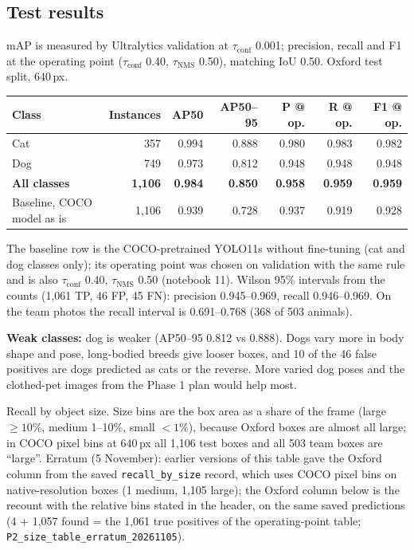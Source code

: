 \documentclass[11pt,a4paper]{article}
\newcommand{\tconf}{$\tau_{\text{conf}}$}
\newcommand{\tnms}{$\tau_{\text{NMS}}$}
\newcommand{\ev}[1]{\nolinkurl{#1}}
\begin{document}
\subsection{Test results}

mAP is measured by Ultralytics validation at \tconf{} 0.001; precision, recall and F1 at the operating point (\tconf{} 0.40, \tnms{} 0.50), matching IoU 0.50. Oxford test split, 640\,px.

{\small
\begin{tabularx}{\linewidth}{@{}Y r r r r r r@{}}
\toprule
Class & Instances & AP50 & AP50--95 & P @ op. & R @ op. & F1 @ op. \\
\midrule
Cat & 357 & 0.994 & 0.888 & 0.980 & 0.983 & 0.982 \\
Dog & 749 & 0.973 & 0.812 & 0.948 & 0.948 & 0.948 \\
\midrule
\textbf{All classes} & \textbf{1,106} & \textbf{0.984} & \textbf{0.850} & \textbf{0.958} & \textbf{0.959} & \textbf{0.959} \\
\midrule
Baseline, COCO model as is & 1,106 & 0.939 & 0.728 & 0.937 & 0.919 & 0.928 \\
\bottomrule
\end{tabularx}}

\smallskip
The baseline row is the COCO-pretrained YOLO11s without fine-tuning (cat and dog classes only); its operating point was chosen on validation with the same rule and is also \tconf{} 0.40, \tnms{} 0.50 (notebook 11). Wilson 95\% intervals from the counts (1,061 TP, 46 FP, 45 FN): precision 0.945--0.969, recall 0.946--0.969. On the team photos the recall interval is 0.691--0.768 (368 of 503 animals).

\smallskip
\textbf{Weak classes:} dog is weaker (AP50--95 0.812 vs 0.888). Dogs vary more in body shape and pose, long-bodied breeds give looser boxes, and 10 of the 46 false positives are dogs predicted as cats or the reverse. More varied dog poses and the clothed-pet images from the Phase 1 plan would help most.

\medskip
Recall by object size. Size bins are the box area as a share of the frame (large $\geq10\%$, medium 1--10\%, small $<1\%$), because Oxford boxes are almost all large; in COCO pixel bins at 640\,px all 1,106 test boxes and all 503 team boxes are ``large''. Erratum (5 November): earlier versions of this table gave the Oxford column from the saved \texttt{recall\_by\_size} record, which uses COCO pixel bins on native-resolution boxes (1 medium, 1,105 large); the Oxford column below is the recount with the relative bins stated in the header, on the same saved predictions (4 + 1,057 found = the 1,061 true positives of the operating-point table; \ev{P2_size_table_erratum_20261105}).
\end{document}
